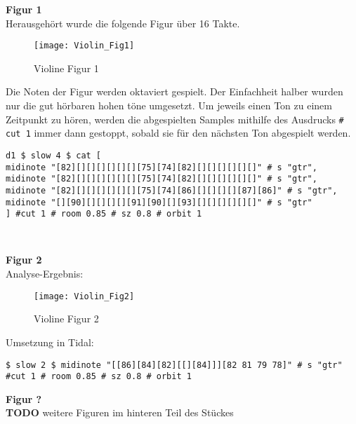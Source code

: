 \documentclass[
10pt, %
a4paper, %
oneside, %
headinclude,footinclude, %
BCOR5mm, %
]{scrartcl}
\begin{document}
\noindent\textbf{Figur 1}\\
Herausgehört wurde die folgende Figur über 16 Takte.
\begin{figure}[h]
	\centering 
	\texttt{[image: Violin\_Fig1]} 
	\caption{Violine Figur 1}
\end{figure}

\noindent Die Noten der Figur werden oktaviert gespielt. Der Einfachheit halber wurden nur die gut hörbaren hohen töne umgesetzt. Um jeweils einen Ton zu einem Zeitpunkt zu hören, werden die abgespielten Samples mithilfe des Ausdrucks \verb|# cut 1| immer dann gestoppt, sobald sie für den nächsten Ton abgespielt werden.\cite{tid12}

\begin{lstlisting}
d1 $ slow 4 $ cat [
midinote "[82][][][][][][][75][74][82][][][][][][]" # s "gtr",
midinote "[82][][][][][][][75][74][82][][][][][][]" # s "gtr",
midinote "[82][][][][][][][75][74][86][][][][][87][86]" # s "gtr",
midinote "[][90][][][][][91][90][][93][][][][][][]" # s "gtr"
] #cut 1 # room 0.85 # sz 0.8 # orbit 1 
\end{lstlisting}\

\noindent\textbf{Figur 2}\\
Analyse-Ergebnis:
\begin{figure}[h]
	\centering 
	\texttt{[image: Violin\_Fig2]} 
	\caption{Violine Figur 2}
\end{figure}

\noindent Umsetzung in Tidal:
\begin{lstlisting}
$ slow 2 $ midinote "[[86][84][82][[][84]]][82 81 79 78]" # s "gtr" #cut 1 # room 0.85 # sz 0.8 # orbit 1
\end{lstlisting}

\noindent\textbf{Figur ?}\\
{\color{red}\textbf{TODO}} weitere Figuren im hinteren Teil des Stückes
\end{document}
